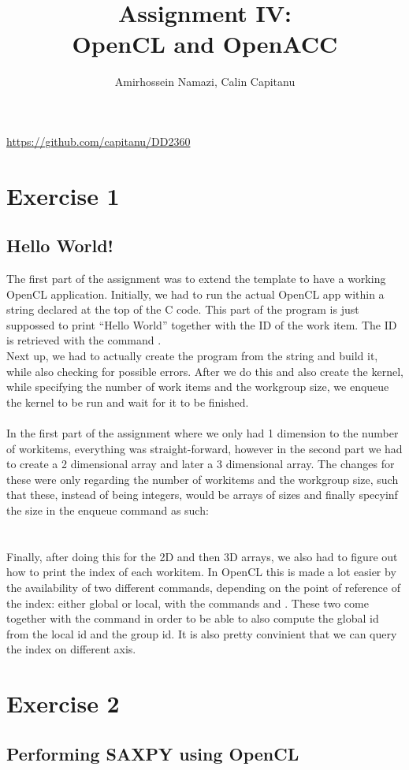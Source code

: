 \documentclass[english]{exam}
\begin{document}
\title{Assignment IV:\\ OpenCL and OpenACC}
\author{Amirhossein Namazi, Calin Capitanu}

\maketitle
\begin{center}
  \url{https://github.com/capitanu/DD2360} \\
\end{center}

\chapter{Exercise 1}
\section*{Hello World!}

The first part of the assignment was to extend the template to have a working OpenCL application. Initially, we had to run the actual OpenCL app within a string declared at the top of the C code. This part of the program is just suppossed to print ``Hello World'' together with the ID of the work item. The ID is retrieved with the command . \\
Next up, we had to actually create the program from the string and build it, while also checking for possible errors. After we do this and also create the kernel, while specifying the number of work items and the workgroup size, we enqueue the kernel to be run and wait for it to be finished.
\\\\
In the first part of the assignment where we only had 1 dimension to the number of workitems, everything was straight-forward, however in the second part we had to create a 2 dimensional array and later a 3 dimensional array. The changes for these were only regarding the number of workitems and the workgroup size, such that these, instead of being integers, would be arrays of sizes and finally specyinf the size in the enqueue command as such:\\
\\\\
Finally, after doing this for the 2D and then 3D arrays, we also had to figure out how to print the index of each workitem. In OpenCL this is made a lot easier by the availability of two different commands, depending on the point of reference of the index: either global or local, with the commands  and . These two come together with the command  in order to be able to also compute the global id from the local id and the group id. It is also pretty convinient that we can query the index on different axis.

\clearpage
\chapter{Exercise 2}
\section*{Performing SAXPY using OpenCL}



\renewcommand{\bibname}{References}

\end{document}
